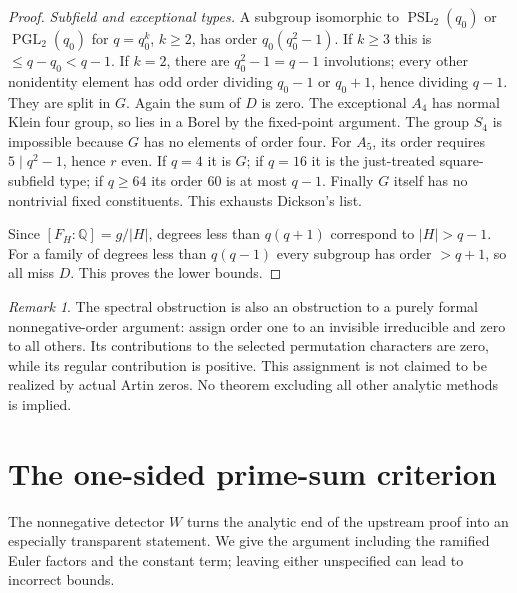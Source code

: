 \documentclass[11pt]{article}
\theoremstyle{remark}\newtheorem{remark}[theorem]{Remark}
\DeclareMathOperator{\PSL}{PSL}\DeclareMathOperator{\SL}{SL}\DeclareMathOperator{\PGL}{PGL}\DeclareMathOperator{\Ind}{Ind}\DeclareMathOperator{\ord}{ord}\DeclareMathOperator{\Gal}{Gal}\DeclareMathOperator{\Tr}{Tr}\DeclareMathOperator{\Rea}{Re}\DeclareMathOperator{\FP}{FP}
\newcommand{\Q}{\mathbb Q}\newcommand{\C}{\mathbb C}\newcommand{\F}{\mathbb F}\newcommand{\one}{\mathbf 1}\newcommand{\St}{\mathrm{St}}\newcommand{\Gg}{\Gamma}\newcommand{\PT}{\mathcal P}\newcommand{\eps}{\varepsilon}
\begin{document}
\begin{proof}
\emph{Subfield and exceptional types.} A subgroup isomorphic to $\PSL_2(q_0)$ or $\PGL_2(q_0)$ for $q=q_0^k$, $k\ge2$, has order $q_0(q_0^2-1)$. If $k\ge3$ this is $\le q-q_0<q-1$. If $k=2$, there are $q_0^2-1=q-1$ involutions; every other nonidentity element has odd order dividing $q_0-1$ or $q_0+1$, hence dividing $q-1$. They are split in $G$. Again the sum of $D$ is zero. The exceptional $A_4$ has normal Klein four group, so lies in a Borel by the fixed-point argument. The group $S_4$ is impossible because $G$ has no elements of order four. For $A_5$, its order requires $5\mid q^2-1$, hence $r$ even. If $q=4$ it is $G$; if $q=16$ it is the just-treated square-subfield type; if $q\ge64$ its order $60$ is at most $q-1$. Finally $G$ itself has no nontrivial fixed constituents. This exhausts Dickson's list.

Since $[F_H:\Q]=g/|H|$, degrees less than $q(q+1)$ correspond to $|H|>q-1$. For a family of degrees less than $q(q-1)$ every subgroup has order $>q+1$, so all miss $D$. This proves the lower bounds.
\end{proof}
\begin{remark}
The spectral obstruction is also an obstruction to a purely formal nonnegative-order argument: assign order one to an invisible irreducible and zero to all others. Its contributions to the selected permutation characters are zero, while its regular contribution is positive. This assignment is not claimed to be realized by actual Artin zeros. No theorem excluding all other analytic methods is implied.
\end{remark}

\section{The one-sided prime-sum criterion}\label{sec:criterion}
The nonnegative detector $W$ turns the analytic end of the upstream proof into an especially transparent statement. We give the argument including the ramified Euler factors and the constant term; leaving either unspecified can lead to incorrect bounds.
\end{document}
